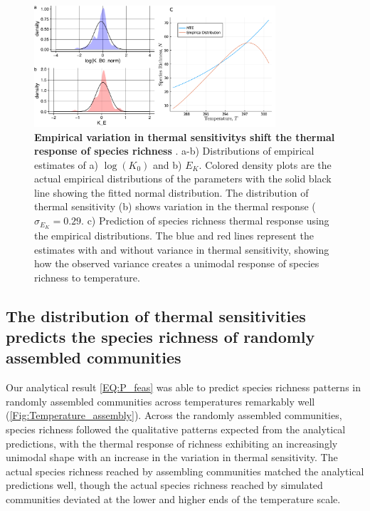 \documentclass{article}
\begin{document}
\begin{figure}
    \centering
    \includegraphics[width = 0.8\textwidth]{docs/Figures/MTE_fig.pdf}
    \caption{\textbf{Empirical variation in thermal sensitivitys shift the thermal response of species richness }. a-b) Distributions of empirical estimates of a) $\log(K_0)$ and b) $E_K$. Colored density plots are the actual empirical distributions of the parameters with the solid black line showing the fitted normal distribution. The distribution of thermal sensitivity (b) shows variation in the thermal response ($\sigma_{E_K} = 0.29$. c) Prediction of species richness thermal response using the empirical distributions. The blue and red lines represent the estimates with and without variance in thermal sensitivity, showing how the observed variance creates a unimodal response of species richness to temperature.}
    \label{Fig:TPC_data}
\end{figure}

\subsection*{The distribution of thermal sensitivities predicts the species richness of randomly assembled communities}

Our analytical result \cref{EQ:P_feas} was able to predict species richness patterns in randomly assembled communities across temperatures remarkably well (\cref{Fig:Temperature_assembly}). Across the randomly assembled communities, species richness followed the qualitative patterns expected from the analytical predictions, with the thermal response of richness exhibiting an increasingly unimodal shape with an increase in the variation in thermal sensitivity. The actual species richness reached by assembling communities matched the analytical predictions well, though the actual species richness reached by simulated communities deviated at the lower and higher ends of the temperature scale. 
\end{document}
